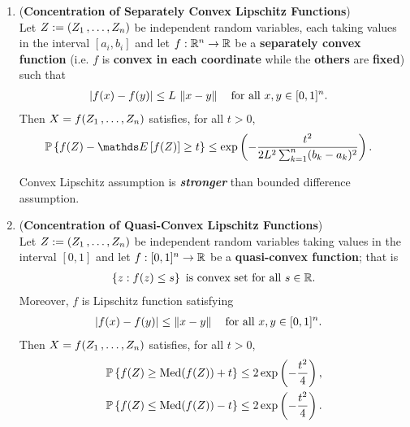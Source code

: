 \documentclass[11pt]{article}
\begin{document}
\begin{itemize}
\begin{remark}
\begin{enumerate}
\item \begin{theorem} (\textbf{Concentration of Separately Convex Lipschitz Functions}) \citep{boucheron2013concentration}\\
Let  $Z:= (Z_1 \,{,}\ldots{,}\, Z_{n})$ be independent random variables, each taking values in the interval $[a_i, b_i]$ and let $f : {\mathbb R}^n \to {\mathbb R}$ be a \textbf{separately convex function} (i.e. $f$ is \textbf{convex in each coordinate} while the \textbf{others} are \textbf{fixed}) such that
\begin{align*}
\left\lvert f(x) - f(y) \right\rvert &\le L\,\left\|x - y\right\|_{} \quad \text{for all }x, y \in [0, 1]^n.
\end{align*}
Then $X = f(Z_1 \,{,}\ldots{,}\, Z_{n})$ satisfies, for all $t > 0$,
\begin{align*}
\bP\set{f(Z) - \E{}{f(Z)} \ge t } &\le \exp\paren{- \frac{t^2}{2L^2 \sum_{k=1}^{n}(b_k - a_k)^2}}. 
\end{align*}
\end{theorem} Convex Lipschitz assumption is \emph{\textbf{stronger}} than bounded difference assumption.

\item \begin{theorem} (\textbf{Concentration of Quasi-Convex Lipschitz Functions}) \citep{boucheron2013concentration}\\
Let  $Z:= (Z_1 \,{,}\ldots{,}\, Z_{n})$ be independent random variables taking values in the interval $[0, 1]$ and let $f : [0, 1]^n \to {\mathbb R}$ be a \textbf{quasi-convex function}; that is
\begin{align*}
\left\{z: f(z) \le s\right\} \text{ is convex set for all }s \in {\mathbb R}. 
\end{align*} Moreover, $f$ is Lipschitz function satisfying
\begin{align*}
\left\lvert f(x) - f(y) \right\rvert &\le \left\|x - y\right\|_{} \quad \text{for all }x, y \in [0, 1]^n.
\end{align*}
Then $X = f(Z_1 \,{,}\ldots{,}\, Z_{n})$ satisfies, for all $t > 0$,
\begin{align*}
{\mathbb P}\left\{f(Z)  \ge  \text{Med}(f(Z)) + t \right\} &\le 2\exp\left(- \frac{t^2}{4}\right), \\
{\mathbb P}\left\{f(Z)  \le \text{Med}(f(Z)) -t \right\} &\le 2\exp\left(- \frac{t^2}{4}\right). \nonumber
\end{align*}
\end{theorem}
\end{enumerate}
\end{remark}
\end{itemize}
\end{document}
